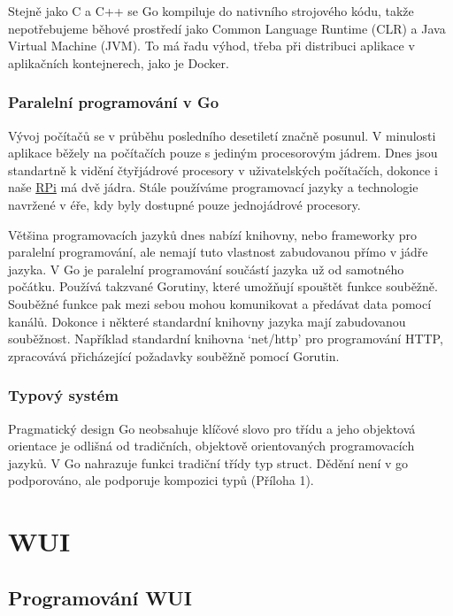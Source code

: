 \documentclass[czech,12pt,a4paper]{article}
\begin{document}
Stejně jako C a C++ se Go kompiluje do nativního strojového kódu, takže
nepotřebujeme běhové prostředí jako Common Language Runtime (CLR) a Java Virtual Machine (JVM). To má řadu výhod, třeba při distribuci aplikace v aplikačních kontejnerech, jako je Docker.

\subsubsection{Paralelní programování v Go}

Vývoj počítačů se v průběhu posledního desetiletí značně posunul. V minulosti aplikace běžely na počítačích pouze s jediným procesorovým jádrem. Dnes jsou standartně k vidění čtyřjádrové procesory v uživatelských počítačích, dokonce i naše \underline{\ac{RPi}} má dvě jádra. Stále používáme programovací jazyky a technologie navržené v éře, kdy byly dostupné pouze jednojádrové procesory.

Většina programovacích jazyků dnes nabízí knihovny, nebo frameworky pro \linebreak paralelní programování, ale nemají tuto vlastnost zabudovanou přímo v jádře jazyka. V Go je paralelní programování součástí jazyka už od samotného počátku. Používá takzvané Gorutiny, které umožňují spouštět funkce souběžně. Souběžné funkce pak mezi sebou mohou komunikovat a předávat data pomocí kanálů. Dokonce i některé standardní knihovny jazyka mají zabudovanou souběžnost. Například standardní knihovna `net/http' pro programování HTTP, zpracovává přicházející požadavky souběžně pomocí Gorutin.

\subsubsection{Typový systém}

Pragmatický design Go neobsahuje klíčové slovo pro třídu a jeho objektová orientace je odlišná od tradičních, objektově orientovaných programovacích jazyků. V Go nahrazuje funkci tradiční třídy typ struct. Dědění není v go podporováno, ale podporuje kompozici typů (Příloha 1).

\clearpage

\section{WUI} \label{secWUI}

\subsection{Programování WUI}
\end{document}
